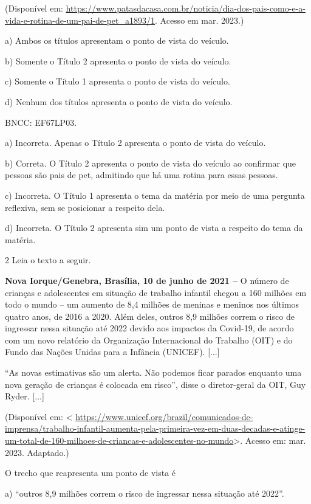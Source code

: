 {(Disponível em:
\url{https://www.patasdacasa.com.br/noticia/dia-dos-pais-como-e-a-vida-e-rotina-de-um-pai-de-pet_a1893/1}.
Acesso em mar. 2023.)

a) Ambos os títulos apresentam o ponto de vista do veículo.

b) Somente o Título 2 apresenta o ponto de vista do veículo.

c) Somente o Título 1 apresenta o ponto de vista do veículo.

d) Nenhum dos títulos apresenta o ponto de vista do veículo.

BNCC: EF67LP03.

a) Incorreta. Apenas o Título 2 apresenta o ponto de vista do veículo.

b) Correta. O Título 2 apresenta o ponto de vista do veículo ao
confirmar que pessoas são pais de pet, admitindo que há uma rotina para
essas pessoas.

c) Incorreta. O Título 1 apresenta o tema da matéria por meio de uma
pergunta reflexiva, sem se posicionar a respeito dela.

d) Incorreta. O Título 2 apresenta sim um ponto de vista a respeito do
tema da matéria.

\num{2} Leia o texto a seguir.

\textbf{Nova Iorque/Genebra, Brasília, 10 de junho de 2021 --} O número
de crianças e adolescentes em situação de trabalho infantil chegou a 160
milhões em todo o mundo -- um aumento de 8,4 milhões de meninas e
meninos nos últimos quatro anos, de 2016 a 2020. Além deles, outros 8,9
milhões correm o risco de ingressar nessa situação até 2022 devido aos
impactos da Covid-19, de acordo com um novo relatório da Organização
Internacional do Trabalho (OIT) e do Fundo das Nações Unidas para a
Infância (UNICEF). {[}...{]}

``As novas estimativas são um alerta. Não podemos ficar parados enquanto
uma nova geração de crianças é colocada em risco'', disse o
diretor-geral da OIT, Guy Ryder. {[}...{]}

(Disponível em: \textless{}
\url{https://www.unicef.org/brazil/comunicados-de-imprensa/trabalho-infantil-aumenta-pela-primeira-vez-em-duas-decadas-e-atinge-um-total-de-160-milhoes-de-criancas-e-adolescentes-no-mundo}\textgreater.
Acesso em: mar. 2023. Adaptado.)

O trecho que reapresenta um ponto de vista é

a) ``outros 8,9 milhões correm o risco de ingressar nessa situação até
2022''.

}

